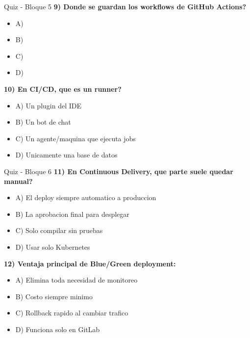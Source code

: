\documentclass[aspectratio=169]{beamer}
\begin{document}
\begin{frame}{Quiz - Bloque 5}
	\small
	\textbf{9) Donde se guardan los workflows de GitHub Actions?}
	\begin{itemize}
		\item A) 
		\item B) 
		\item C) 
		\item D) 
	\end{itemize}

	\textbf{10) En CI/CD, que es un runner?}
	\begin{itemize}
		\item A) Un plugin del IDE
		\item B) Un bot de chat
		\item C) Un agente/maquina que ejecuta jobs
		\item D) Unicamente una base de datos
	\end{itemize}
\end{frame}

\begin{frame}{Quiz - Bloque 6}
	\small
	\textbf{11) En Continuous Delivery, que parte suele quedar manual?}
	\begin{itemize}
		\item A) El deploy siempre automatico a produccion
		\item B) La aprobacion final para desplegar
		\item C) Solo compilar sin pruebas
		\item D) Usar solo Kubernetes
	\end{itemize}

	\textbf{12) Ventaja principal de Blue/Green deployment:}
	\begin{itemize}
		\item A) Elimina toda necesidad de monitoreo
		\item B) Costo siempre minimo
		\item C) Rollback rapido al cambiar trafico
		\item D) Funciona solo en GitLab
	\end{itemize}
\end{frame}
\end{document}
